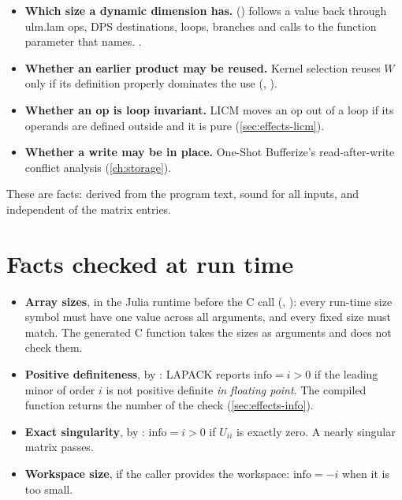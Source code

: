 \begin{itemize}
\item \textbf{Which size a dynamic dimension has.} 
  () follows a value back through
  ulm.lam ops, DPS destinations, loops, branches and calls to the function
  parameter that  names. .
\item \textbf{Whether an earlier product may be reused.} Kernel selection
  reuses \(W\) only if its definition properly dominates the use
  (, ).
\item \textbf{Whether an op is loop invariant.} LICM moves an op out of a
  loop if its operands are defined outside and it is pure
  (\cref{sec:effects-licm}).
\item \textbf{Whether a write may be in place.} One-Shot Bufferize's
  read-after-write conflict analysis (\cref{ch:storage}).
\end{itemize}

These are \Oana{} facts: derived from the program text, sound for all
inputs, and independent of the matrix entries.

\section{Facts checked at run time}
\label{sec:facts-runtime}

\begin{itemize}
\item \textbf{Array sizes}, in the Julia runtime before the C call
  (, ):
  every run-time size symbol must have one value across all arguments, and
  every fixed size must match. The generated C function takes the sizes as
  arguments and does not check them.
\item \textbf{Positive definiteness}, by : LAPACK reports
  \(\mathrm{info}=i>0\) if the leading minor of order \(i\) is not
  positive definite \emph{in floating point}. The compiled function returns
  the number of the check (\cref{sec:effects-info}).
\item \textbf{Exact singularity}, by : \(\mathrm{info}=i>0\)
  if \(U_{ii}\) is exactly zero. A nearly singular matrix passes.
\item \textbf{Workspace size}, if the caller provides the workspace:
  \(\mathrm{info} = -i\) when it is too small.
\end{itemize}


